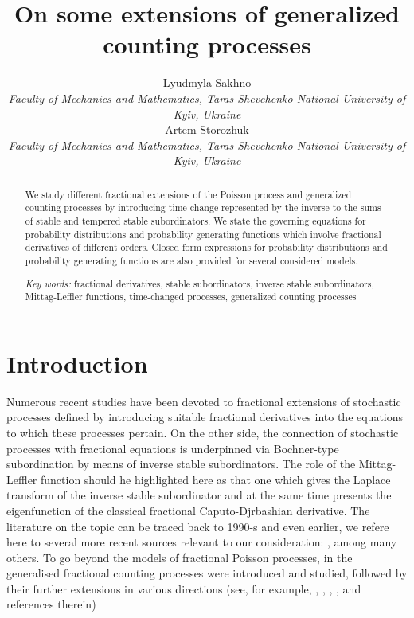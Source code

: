 \documentclass[12pt]{article}
\theoremstyle{definition}
\theoremstyle{plain}
\begin{document}
\title{On some extensions of generalized counting processes}
\author{
Lyudmyla Sakhno%
\\
{\it\small Faculty of Mechanics and Mathematics,
	Taras Shevchenko National University of Kyiv,  Ukraine}\\
Artem Storozhuk\\
{\it\small Faculty of Mechanics and Mathematics,
	Taras Shevchenko National University of Kyiv, Ukraine}}

\maketitle

\begin{abstract} We study different fractional extensions of the Poisson process and generalized counting processes by introducing time-change represented by the inverse to the sums of stable and tempered stable subordinators. We state the governing equations for probability distributions and probability generating functions which involve fractional derivatives of different orders. Closed form expressions for probability distributions and probability generating functions are also provided for several considered models.

\medskip

\textit{Key words:} fractional derivatives, stable subordinators, inverse stable subordinators, Mittag-Leffler functions, time-changed processes, generalized counting processes
\medskip
\end{abstract}

\bigskip

\section{Introduction}

Numerous recent studies have been devoted to fractional extensions of stochastic processes defined by introducing suitable fractional derivatives into the equations to which these processes pertain. On the other side, the connection of stochastic processes with fractional equations is underpinned via Bochner-type subordination by means of inverse stable subordinators. The role of the Mittag-Leffler function should he highlighted here as that one which gives the Laplace transform of the inverse stable subordinator and at the same time presents the eigenfunction of the classical fractional Caputo-Djrbashian derivative. The literature on the topic can be traced back to 1990-s and even earlier, we refere here to several more recent sources relevant to our consideration: \cite{BO2009,BO2010, DovOrsToaldo, GKL202, MS, MNV, OBPTRF, OT, OT2017}, among many others. To go beyond the models of fractional Poisson processes, in \cite{DiC} the generalised fractional counting processes were introduced and studied, followed by their further extensions in  various directions   (see, for example, \cite{KLS}, \cite{KK2022a}, \cite{KK2022b}, \cite{KK2022Arxiv},  and references therein)
\end{document}
